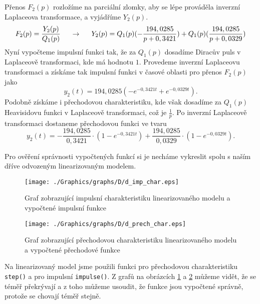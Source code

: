 \documentclass{article}
\begin{document}
			Přenos \(F_{2}(p)\) rozložíme na parciální zlomky, aby se lépe prováděla inverzní Laplaceova transformace, a vyjádříme \(Y_{2}(p)\).
			\[F_{2}(p)=\frac{Y_{2}(p)}{Q_{1}(p)}\hspace{5mm} \rightarrow \hspace{5mm} Y_{2}(p)=Q_{1}(p)(-\frac{194,0285}{p+0,3421})+Q_{1}(p)(\frac{194,0285}{p+0,0329})\]
			Nyní vypočteme impulsní funkci tak, že za \(Q_{1}(p)\) dosadíme Diracův puls v Laplaceově transformaci, kde má hodnotu \(1\). Provedeme inverzní Laplaceovu transformaci a získáme tak impulsní funkci v časové oblasti pro přenos \(F_{2}(p)\) jako
			\[y_{2}(t)=194,0285\left(-e^{-0,3421 t}+e^{-0,0329 t}\right).\]
			Podobně získáme i přechodovou charakteristiku, kde však dosadíme za \(Q_{1}(p)\) Heavisidovu funkci v Laplaceově transformaci, což je \(\frac{1}{p}\). Po inverzní Laplaceově transformaci dostaneme přechodovou funkci ve tvaru
			\[y_{2}(t)=-\frac{194,0285}{0,3421}\cdot (1-e^{-0,3421 t})+\frac{194,0285}{0,0329}\cdot (1-e^{-0,0329 t}).\]

			Pro ověření správnosti vypočtených funkcí si je necháme vykreslit spolu s naším dříve odvozeným linearizovaným modelem.
				\begin{figure}[H]
					\centering
					\texttt{[image: ./Graphics/graphs/D/d\_imp\_char.eps]}
					\caption{Graf zobrazující impulsní charakteristiku linearizovaného modelu a vypočtené impulsní funkce}
					\label{graph:d_impulsni_char}
				\end{figure}

				\begin{figure}[H]
					\centering
					\texttt{[image: ./Graphics/graphs/D/d\_prech\_char.eps]}
					\caption{Graf zobrazující přechodovou charakteristiku linearizovaného modelu a vypočtené přechodové funkce}
					\label{graph:d_prechodova_char}
				\end{figure}
			Na linearizovaný model jsme použili funkci pro přechodovou charakteristiku \verb|step()| a pro impulsní \verb|impulse()|. Z grafů na obrázcích \ref{graph:d_impulsni_char} a \ref{graph:d_prechodova_char} můžeme vidět, že se téměř překrývají a z toho můžeme usoudit, že funkce jsou vypočtené správně, protože se chovají téměř stejně.
\end{document}
